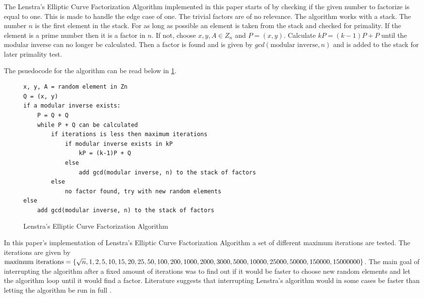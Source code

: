 The Lenstra's Elliptic Curve Factorization Algorithm implemented in this paper starts of by checking if the given number to factorize is equal to one. This is made to handle the edge case of one. The trivial factors are of no relevance. The algorithm works with a stack. The number $n$ is the first element in the stack. For as long as possible an element is taken from the stack and checked for primality. If the element is a prime number then it is a factor in $n$. If not, choose $x, y, A \in Z_n$ and $P= (x, y)$. Calculate $kP = (k-1)P + P$ until the modular inverse can no longer be calculated. Then a factor is found and is given by $gcd(\text{modular inverse}, n)$ and is added to the stack for later primality test. 

The psuedocode for the algorithm can be read below in \ref{fig:LenstrasEllipticCurveFactorizationAlgorithm}.
\begin{figure}[H]
    \centering
    \begin{minipage}{0.5\textwidth}
        \begin{verbatim}
x, y, A = random element in Zn
Q = (x, y)
if a modular inverse exists:
    P = Q + Q
    while P + Q can be calculated 
        if iterations is less then maximum iterations
            if modular inverse exists in kP
                kP = (k-1)P + Q
            else
                add gcd(modular inverse, n) to the stack of factors
        else
            no factor found, try with new random elements
else
    add gcd(modular inverse, n) to the stack of factors
        \end{verbatim}
    \end{minipage}
     \caption{Lenstra's Elliptic Curve Factorization Algorithm}
    \label{fig:LenstrasEllipticCurveFactorizationAlgorithm}      
 \end{figure}
 
 In this paper's implementation of Lenstra's Elliptic Curve Factorization Algorithm a set of different maximum iterations are tested. The iterations are given by $\text{maximum iterations} = \{\sqrt{n}, 1, 2, 5, 10, 15, 20, 25, 50, 100, 200, 1000, 2000, 3000,\\ 5000, 10000, 25000, 50000, 150000, 15000000\}$. The main goal of interrupting the algorithm after a fixed amount of iterations was to find out if it would be faster to choose new random elements and let the algorithm loop until it would find a factor. Literature suggests that interrupting Lenstra's algorithm would in some cases be faster than letting the algorithm be run in full \cite{LenstrasFactorizationAlgorithm}.

